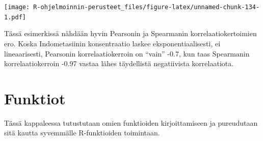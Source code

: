 \documentclass[
]{book}
\newenvironment{Shaded}{\begin{snugshade}}{\end{snugshade}}
\newcommand{\AttributeTok}[1]{\textcolor[rgb]{0.77,0.63,0.00}{#1}}
\newcommand{\CommentTok}[1]{\textcolor[rgb]{0.56,0.35,0.01}{\textit{#1}}}
\newcommand{\DecValTok}[1]{\textcolor[rgb]{0.00,0.00,0.81}{#1}}
\newcommand{\FunctionTok}[1]{\textcolor[rgb]{0.00,0.00,0.00}{#1}}
\newcommand{\NormalTok}[1]{#1}
\newcommand{\OtherTok}[1]{\textcolor[rgb]{0.56,0.35,0.01}{#1}}
\newcommand{\SpecialCharTok}[1]{\textcolor[rgb]{0.00,0.00,0.00}{#1}}
\newcommand{\StringTok}[1]{\textcolor[rgb]{0.31,0.60,0.02}{#1}}
\begin{document}
\begin{Shaded}
\end{Shaded}

\texttt{[image: R-ohjelmoinnin-perusteet\_files/figure-latex/unnamed-chunk-134-1.pdf]}

Tässä esimerkissä nähdään hyvin Pearsonin ja Spearmanin korrelaatiokertoimien ero. Koska Indometasiinin konsentraatio laskee eksponentiaalisesti, ei lineaarisesti, Pearsonin korrelaatiokerroin on ``vain'' -0.7, kun taas Spearmanin korrelaatiokerroin -0.97 vastaa lähes täydellistä negatiivista korrelaatiota.

\hypertarget{functions}{%
\chapter{Funktiot}\label{functions}}

Tässä kappaleessa tutustutaan omien funktioiden kirjoittamiseen ja pureudutaan sitä kautta syvemmälle R-funktioiden toimintaan.
\end{document}
